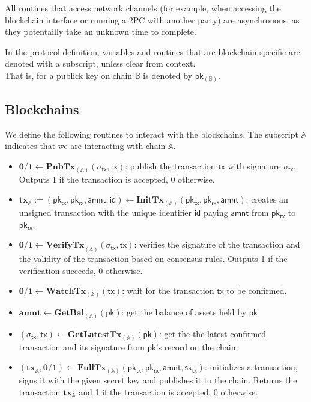 \documentclass{article}      	%
\begin{document}
All routines that access network channels (for example, when accessing the blockchain interface or running a 2PC with another party) are asynchronous, as they potentailly take an unknown time to complete.

In the protocol definition, variables and routines that are blockchain-specific are denoted with a subscript, unless clear from context. \\
That is, for a publick key on chain $\mathbb{B}$ is denoted by $\mathsf{pk_{(\mathbb{B})}}$. \\

\subsection{Blockchains}

We define the following routines to interact with the blockchains. The subscript $\mathbb{A}$ indicates that we are interacting with chain $\mathbb{A}$.

\begin{itemize}[topsep=0pt, itemsep=0pt, leftmargin=2em]
    \item $\mathbf{0/1} \gets \mathbf{PubTx}_{(\mathbb{A})}(\sigma_{\mathsf{tx}}, \mathsf{tx})$: publish the transaction $\mathsf{tx}$ with signature $\sigma_{\mathsf{tx}}$. Outputs 1 if the transaction is accepted, 0 otherwise.
    \item $\mathbf{tx}_{\mathbb{A}} := (\mathsf{pk_{tx}}, \mathsf{pk_{rx}}, \mathsf{amnt}, \mathsf{id})  \gets \mathbf{InitTx}_{(\mathbb{A})}(\mathsf{pk_{tx}}, \mathsf{pk_{rx}}, \mathsf{amnt})$: creates an unsigned transaction with the unique identifier $\mathsf{id}$ paying $\mathsf{amnt}$ from $\mathsf{pk_{tx}}$ to $\mathsf{pk_{rx}}$.
    \item $\mathbf{0/1} \gets \mathbf{VerifyTx}_{(\mathbb{A})}(\sigma_{\mathsf{tx}}, \mathsf{tx})$: verifies the signature of the transaction and the validity of the transaction based on consensus rules. Outputs 1 if the verification succeeds, 0 otherwise.
    \item $\mathbf{0/1} \gets \mathbf{WatchTx}_{(\mathbb{A})}(\mathsf{tx})$: wait for the transaction $\mathsf{tx}$ to be confirmed.
    \item $\mathbf{amnt} \gets \mathbf{GetBal}_{(\mathbb{A})}(\mathsf{pk})$: get the balance of assets held by $\mathsf{pk}$
    \item $(\sigma_{\mathsf{tx}}, \mathsf{tx}) \gets \mathbf{GetLatestTx}_{(\mathbb{A})}(\mathsf{pk})$: get the the latest confirmed transaction and its signature from $\mathsf{pk}$'s record on the chain.
    \item $(\mathbf{tx}_{\mathbb{A}}, \mathbf{0/1})  \gets \mathbf{FullTx}_{(\mathbb{A})}(\mathsf{pk_{tx}}, \mathsf{pk_{rx}}, \mathsf{amnt}, \mathsf{sk_{tx}})$: initializes a transaction, signs it with the given secret key and publishes it to the chain. Returns the transaction $\mathbf{tx}_{\mathbb{A}}$ and 1 if the transaction is accepted, 0 otherwise.
\end{itemize}
\end{document}
